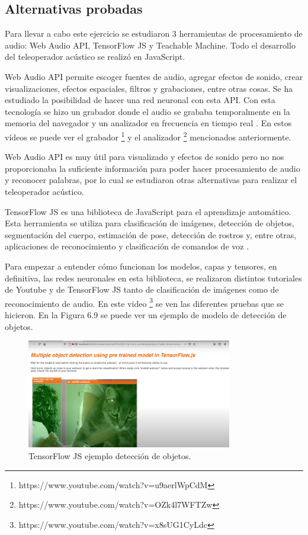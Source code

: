 \subsection{Alternativas probadas}

Para llevar a cabo este ejercicio se estudiaron 3 herramientas de procesamiento de audio: Web Audio API, TensorFlow JS y Teachable Machine. Todo el desarrollo del teleoperador acústico se realizó en JavaScript.

Web Audio API permite escoger fuentes de audio, agregar efectos de sonido, crear visualizaciones, efectos espaciales, filtros y grabaciones, entre otras cosas.
Se ha estudiado la  posibilidad de hacer una red neuronal con esta API. Con esta tecnología se hizo un grabador donde el audio se grababa temporalmente en la memoria del navegador y un analizador en frecuencia en tiempo real \cite{waa} .  En estos vídeos se puede ver el grabador \footnote{https://www.youtube.com/watch?v=u9aerlWpCdM} y el analizador \footnote{https://www.youtube.com/watch?v=OZk4l7WFTZw} mencionados anteriormente.

Web Audio API es muy útil para visualizado y efectos de sonido pero no nos proporcionaba la suficiente información para poder hacer procesamiento de audio y reconocer palabras, por lo cual se estudiaron otras alternativas para realizar el teleoperador acústico. 

TensorFlow JS es una biblioteca de JavaScript para el aprendizaje automático. Esta herramienta se utiliza para clasificación de imágenes, detección de objetos, segmentación del cuerpo, estimación de pose, detección de rostros y, entre otras, aplicaciones de reconocimiento y clasificación de comandos de voz \cite{tensorflowmodel}.

Para empezar a entender cómo funcionan los modelos, capas y  tensores, en definitiva,  las redes neuronales en esta biblioteca, se realizaron distintos tutoriales de Youtube y de TensorFlow JS tanto de clasificación de imágenes como de reconocimiento de audio. En este video \footnote{https://www.youtube.com/watch?v=x8sUG1CyLdc} se ven las diferentes pruebas que se hicieron. En la Figura 6.9 se puede ver un ejemplo de modelo de detección de objetos.

\begin{figure}[H]
    \centering
    \includegraphics[width=0.8\textwidth, height=0.4\textwidth]{chapters/images/imagerecognition.png}
    \caption{TensorFlow JS ejemplo detección de objetos. }
    \label{fig:my_label}
\end{figure}


